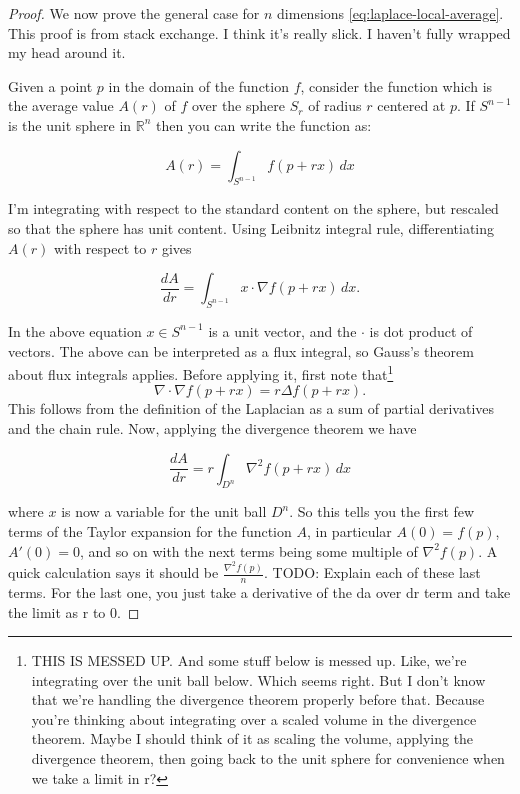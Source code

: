 \begin{proof}
We now prove the general case for $n$ dimensions \eqref{eq:laplace-local-average}. This proof is from stack exchange. I think it's really slick. I haven't fully wrapped my head around it. 

Given a point $p$ in the domain of the function $f$, consider the function which is the average value $A(r)$ of $f$ over the sphere $S_r$ of radius $r$ centered at $p$. If $S^{n-1}$ is the unit sphere in $\mathbb{R}^n$ then you can write the function as:

$$A(r) = \int_{S^{n-1}} f(p + rx) \, dx$$

I'm integrating with respect to the standard content on the sphere, but rescaled so that the sphere has unit content. Using Leibnitz integral rule, differentiating $A(r)$ with respect to $r$ gives

$$\frac{dA}{dr} = \int_{S^{n-1}} x \cdot \nabla f(p + rx) \, dx.$$

In the above equation $x \in S^{n-1}$ is a unit vector, and the $\cdot$ is dot product of vectors. The above can be interpreted as a flux integral, so Gauss's theorem about flux integrals applies. Before applying it, first note that\footnote{THIS IS MESSED UP. And some stuff below is messed up. Like, we're integrating over the unit ball below. Which seems right. But I don't know that we're handling the divergence theorem properly before that. Because you're thinking about integrating over a scaled volume in the divergence theorem. Maybe I should think of it as scaling the volume, applying the divergence theorem, then going back to the unit sphere for convenience when we take a limit in r?}
$$
\nabla \cdot \nabla f(p+rx) = r\Delta f(p+rx).
$$
This follows from the definition of the Laplacian as a sum of partial derivatives and the chain rule. Now, applying the divergence theorem we have

$$\frac{dA}{dr} = r \int_{D^n} \nabla^2 f(p + rx) \, dx$$

where $x$ is now a variable for the unit ball $D^n$. So this tells you the first few terms of the Taylor expansion for the function $A$, in particular $A(0) = f(p)$, $A'(0) = 0$, and so on with the next terms being some multiple of $\nabla^2 f(p)$. A quick calculation says it should be $\frac{\nabla^2 f(p)}{n}$. TODO: Explain each of these last terms. For the last one, you just take a derivative of the da over dr term and take the limit as r to 0. 
\end{proof}

